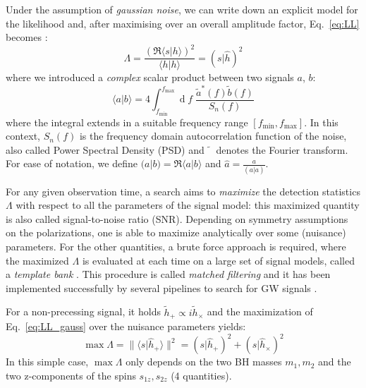 \documentclass[twocolumn,showpacs,preprintnumbers,nofootinbib,prd,
superscriptaddress,10pt]{revtex4-2}
\renewcommand{\d}[1]{\ensuremath{\operatorname{d}\!{#1}}}
\newcommand{\scalar}[2]{\langle #1|#2 \rangle}
\newcommand{\rescalar}[2]{( #1 |#2 )}
\begin{document}
Under the assumption of {\it gaussian noise}, we can write down an explicit model for the likelihood and, after maximising over an overall amplitude factor, Eq.~\eqref{eq:LL} becomes \cite{Creighton_book, Maggiore:2007ulw, Harry:2016ijz}:
\begin{equation}\label{eq:LL_gauss}
	\Lambda = \frac{\left(\Re\scalar{s}{h}\right)^2}{\scalar{h}{h}} = \rescalar{s}{\hat{h}}^2
\end{equation}
where we introduced a {\it complex} scalar product between two signals $a$, $b$:
\begin{equation} \label{eq:scalar_product}
	\scalar{a}{b} = 4 \int_{f_\text{min}}^{f_\text{max}} \!\!\!\! \d{f} \; \frac{\tilde{a}^*(f) \tilde{b}(f)}{S_n(f)}
\end{equation}
where the integral extends in a suitable frequency range $[f_\text{min}, f_\text{max}]$.
In this context, $S_n(f)$ is the frequency domain autocorrelation function of the noise, also called Power Spectral Density (PSD) and $\tilde{\phantom{a}}$ denotes the Fourier transform.
For ease of notation, we define ${\rescalar{a}{b} = \Re\scalar{a}{b}}$ and ${\hat{a} = \frac{a}{\rescalar{a}{a}}}$.

For any given observation time, a search aims to {\it maximize} the detection statistics $\Lambda$ with respect to all the parameters of the signal model: this maximized quantity is also called signal-to-noise ratio (SNR).
Depending on symmetry assumptions on the polarizations, one is able to maximize analytically over some (nuisance) parameters.
For the other quantities, a brute force approach is required, where the maximized $\Lambda$ is evaluated at each time on a large set of signal models, called a {\it template bank} \cite{PhysRevD.77.104017, Mukherjee:2018yra}.
This procedure is called {\it matched filtering} and it has been implemented successfully by several pipelines to search for GW signals \cite{Privitera:2013xza, Usman:2015kfa, Capano:2016dsf, PhysRevD.95.042001, gstlal_paper2, Aubin:2020goo, Chu:2020pjv}.

For a non-precessing signal, it holds $\tilde{h}_+ \propto i\tilde{h}_\times$ and the maximization of Eq.~\eqref{eq:LL_gauss} over the nuisance parameters yields:
\begin{equation}\label{eq:std_snr}
	\max \Lambda = \lVert \scalar{s}{\hat{h}_+} \rVert^2 = \rescalar{s}{\hat{h}_+}^2 + \rescalar{s}{\hat{h}_\times}^2
\end{equation}
In this simple case, $\max\Lambda$ only depends on the two BH masses $m_1, m_2$ and the two z-components of the spins $s_{1z}, s_{2z}$ (4 quantities).
\end{document}
